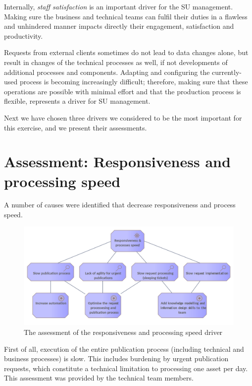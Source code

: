 	Internally, \textit{staff satisfaction} is an important driver for the SU management. Making sure the business and technical teams can fulfil their duties in a flawless and unhindered manner impacts directly their engagement, satisfaction and productivity.
	
	Requests from external clients sometimes do not lead to data changes alone, but result in changes of the technical processes as well, if not developments of additional processes and components. Adapting and configuring the currently-used process is becoming increasingly difficult; therefore, making sure that these operations are possible with minimal effort and that the production process is flexible, represents a driver for SU management. 
	
	Next we have chosen three drivers we considered to be the most important for this exercise, and we present their assessments. 
	
	\section{Assessment: Responsiveness and processing speed}
	
	A number of causes were identified that decrease responsiveness and process speed. 
	
	\begin{figure}[!h]
		\centering
		\includegraphics[width=\textwidth]{images/motivation/Responsiveless & Process Speed.png}
		\caption{The assessment of the responsiveness and processing speed driver}
		\label{fig:responsiveness-and-processing-speed}
	\end{figure}
	
	First of all, execution of the entire publication process (including technical and business processes) is slow. This includes burdening by urgent publication requests, which constitute a technical limitation to processing one asset per day. This assessment was provided by the technical team members. 
	
